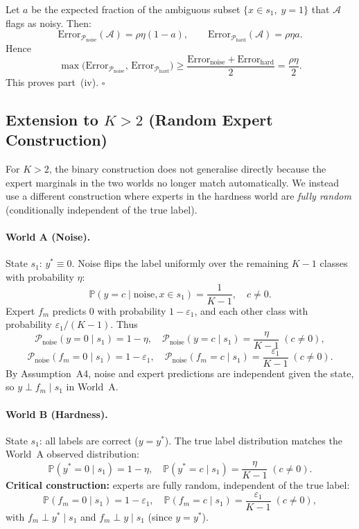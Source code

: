 Let $a$ be the expected fraction of the ambiguous subset
$\{x\in s_1,\;y=1\}$ that $\mathcal{A}$ flags as noisy.  Then:
\[
\mathrm{Error}_{\mathcal{P}_{\text{noise}}}(\mathcal{A}) = \rho\eta(1-a),\qquad
\mathrm{Error}_{\mathcal{P}_{\text{hard}}}(\mathcal{A}) = \rho\eta a.
\]
Hence
\[
\max\bigl(\mathrm{Error}_{\mathcal{P}_{\text{noise}}},\,
         \mathrm{Error}_{\mathcal{P}_{\text{hard}}}\bigr)
\ge \frac{\mathrm{Error}_{\text{noise}}+\mathrm{Error}_{\text{hard}}}{2}
= \frac{\rho\eta}{2}.
\]
This proves part~(iv). \hfill$\square$

\subsection{Extension to $K>2$ (Random Expert Construction)}
\label{sec:thm3_Kgeneral}

For $K>2$, the binary construction does not generalise directly because the
expert marginals in the two worlds no longer match automatically.  We instead
use a different construction where experts in the hardness world are
\emph{fully random} (conditionally independent of the true label).

\paragraph{World A (Noise).}
State $s_1$: $y^*\equiv0$.  Noise flips the label uniformly over the
remaining $K-1$ classes with probability $\eta$:
\[
\mathbb{P}(y=c\mid\text{noise},x\in s_1)=\frac{1}{K-1},\quad c\neq0.
\]
Expert $f_m$ predicts $0$ with probability $1-\varepsilon_1$, and each other
class with probability $\varepsilon_1/(K-1)$.  Thus
\[
\mathcal{P}_{\text{noise}}(y=0\mid s_1)=1-\eta,\quad
\mathcal{P}_{\text{noise}}(y=c\mid s_1)=\frac{\eta}{K-1}\;(c\neq0),
\]
\[
\mathcal{P}_{\text{noise}}(f_m=0\mid s_1)=1-\varepsilon_1,\quad
\mathcal{P}_{\text{noise}}(f_m=c\mid s_1)=\frac{\varepsilon_1}{K-1}\;(c\neq0).
\]
By Assumption~A4, noise and expert predictions are independent given the
state, so $y\perp f_m\mid s_1$ in World~A.

\paragraph{World B (Hardness).}
State $s_1$: all labels are correct ($y=y^*$).  The true label distribution
matches the World~A observed distribution:
\[
\mathbb{P}(y^*=0\mid s_1)=1-\eta,\quad
\mathbb{P}(y^*=c\mid s_1)=\frac{\eta}{K-1}\;(c\neq0).
\]
\textbf{Critical construction:} experts are fully random, independent of the
true label:
\[
\mathbb{P}(f_m=0\mid s_1)=1-\varepsilon_1,\quad
\mathbb{P}(f_m=c\mid s_1)=\frac{\varepsilon_1}{K-1}\;(c\neq0),
\]
with $f_m\perp y^*\mid s_1$ and $f_m\perp y\mid s_1$ (since $y=y^*$).

